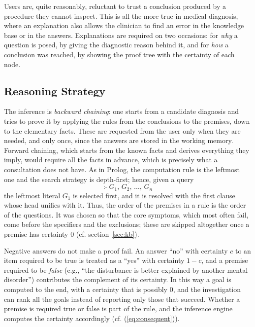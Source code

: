 Users are, quite reasonably, reluctant to trust a conclusion produced by a
procedure they cannot inspect. This is all the more true in medical diagnosis,
where an explanation also allows the clinician to find an error in the
knowledge base or in the answers. Explanations are required on two
occasions: for \emph{why} a question is posed, by giving the
diagnostic reason behind it, and for \emph{how} a conclusion was
reached, by showing the proof tree with the certainty of each node.


\subsection{Reasoning Strategy}

The inference is \emph{backward chaining}: one starts from a candidate
diagnosis and tries to prove it by applying the rules from the conclusions to
the premises, down to the elementary facts. These are requested from the user
only when they are needed, and only once, since the answers are stored in the
working memory. Forward chaining, which starts from the known facts and
derives everything they imply, would require all the facts in advance, which is
precisely what a consultation does not have. As in Prolog, the computation rule is the
leftmost one and the search strategy is depth-first; hence, given
a query
\[
\texttt{:-}\ G_1,\, G_2,\, \dots,\, G_n
\]
the leftmost literal $G_1$ is selected first, and it is resolved with the first
clause whose head unifies with it. Thus, the order of the premises in a rule is the order of the questions. It was
chosen so that the core symptoms, which most often fail, come before the
specifiers and the exclusions; these are skipped altogether once a premise has
certainty $0$ (cf. section~\ref{sec:kb}).

Negative answers do not make a proof fail. An answer ``no'' with certainty $c$
to an item required to be true is treated as a ``yes'' with certainty $1-c$,
and a premise required to be \emph{false} (e.g., ``the disturbance is better
explained by another mental disorder'') contributes the complement of its
certainty. In this way a goal is computed to the end, with a certainty that is
possibly $0$, and the investigation can rank all the goals instead of reporting
only those that succeed. Whether a premise is required true or false
is part of the rule, and the inference engine computes the
certainty accordingly (cf. (\ref{eq:consequent})).
